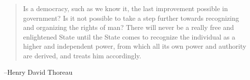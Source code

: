 \documentclass[letterpaper]{exam}
\begin{document}
  \else
    \vspace{10 cm}
    \begin{quote}
      \begin{em}
        Is a democracy, such as we know it, the last improvement possible in
        government? Is it not possible to take a step further towards
        recognizing and organizing the rights of man? There will never be a
        really free and enlightened State until the State comes to recognize the
        individual as a higher and independent power, from which all its own
        power and authority are derived, and treats him accordingly. 
      \end{em}
    \end{quote}
    \hspace{1 cm} --Henry David Thoreau
  \fi
\end{document}
